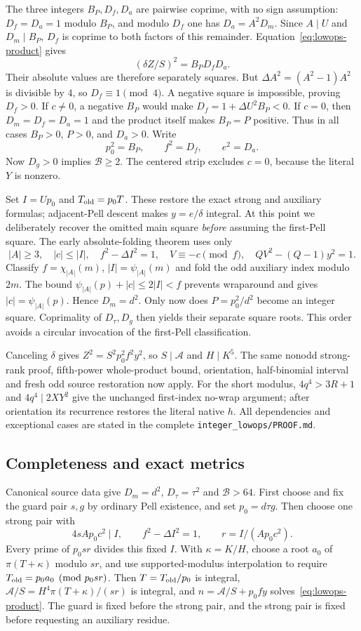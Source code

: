 The three integers $B_P,D_f,D_a$ are pairwise coprime, with no sign
assumption: $D_f=D_a=1$ modulo $B_P$, and modulo $D_f$ one has
$D_a=A^2D_m$. Since $A\mid U$ and $D_m\mid B_P$, $D_f$ is coprime
to both factors of this remainder. Equation~\eqref{eq:lowops-product}
gives
\[
 (\delta Z/S)^2=B_PD_fD_a.
\]
Their absolute values are therefore separately squares. But
$\Delta A^2=(A^2-1)A^2$ is divisible by $4$, so $D_f\equiv1\pmod4$.
A negative square is impossible, proving $D_f>0$.
If $c\ne0$, a negative $B_P$ would make
$D_f=1+\Delta U^2B_P<0$. If $c=0$, then $D_m=D_f=D_a=1$ and the
product itself makes $B_P=P$ positive. Thus in all cases $B_P>0$, $P>0$,
and $D_a>0$. Write
\[
 p_0^2=B_P,\qquad f^2=D_f,\qquad e^2=D_a.
\]
Now $D_g>0$ implies $\mathcal B\ge2$. The centered strip excludes
$c=0$, because the literal $Y$ is nonzero.

Set $I=Up_0$ and $T_{\rm old}=p_0T$. These restore the exact strong and
auxiliary formulas; adjacent-Pell descent makes $y=e/\delta$ integral.
At this point we deliberately recover the omitted main square
\emph{before} assuming the first-Pell square.
The early absolute-folding theorem uses only
\[
 |A|\ge3,\quad |c|\le|I|,\quad f^2-\Delta I^2=1,
 \quad V\equiv-c\pmod f,
 \quad QV^2-(Q-1)y^2=1.
\]
Classify $f=\chi_{|A|}(m)$, $|I|=\psi_{|A|}(m)$ and fold the odd
auxiliary index modulo $2m$. The bound
$\psi_{|A|}(p)+|c|\le2|I|<f$ prevents wraparound and gives
$|c|=\psi_{|A|}(p)$. Hence $D_m=d^2$.
Only now does $P=p_0^2/d^2$ become an integer square. Coprimality of
$D_\tau,D_g$ then yields their separate square roots. This order avoids
a circular invocation of the first-Pell classification.

Canceling $\delta$ gives $Z^2=S^2p_0^2f^2y^2$, so $S\mid\mathcal A$
and $H\mid K^5$. The same nonodd strong-rank proof, fifth-power
whole-product bound, orientation, half-binomial interval and fresh odd
source restoration now apply. For the short modulus, $4q^4>3R+1$ and
$4q^4\mid2XY^2$ give the unchanged first-index no-wrap argument;
after orientation its recurrence restores the literal native $h$.
All dependencies and exceptional cases are stated in the complete
\texttt{integer\_lowops/PROOF.md}.

\subsection{Completeness and exact metrics}
Canonical source data give $D_m=d^2$, $D_\tau=\tau^2$ and
$\mathcal B>64$. First choose and fix the guard pair $s,g$ by ordinary
Pell existence, and set $p_0=d\tau g$. Then choose one strong pair with
\[
 4sAp_0c^2\mid I,\qquad f^2-\Delta I^2=1,\qquad
 r=I/(Ap_0c^2).
\]
Every prime of $p_0sr$ divides this fixed $I$.
With $\kappa=K/H$, choose a root $a_0$ of $\pi(T+\kappa)$ modulo $sr$,
and use supported-modulus interpolation to require
$T_{\rm old}=p_0a_0\pmod{p_0sr}$.
Then $T=T_{\rm old}/p_0$ is integral,
$\mathcal A/S=H^4\pi(T+\kappa)/(sr)$ is integral, and
$n=\mathcal A/S+p_0fy$ solves~\eqref{eq:lowops-product}.
The guard is fixed before the strong pair, and the strong pair is fixed
before requesting an auxiliary residue.

